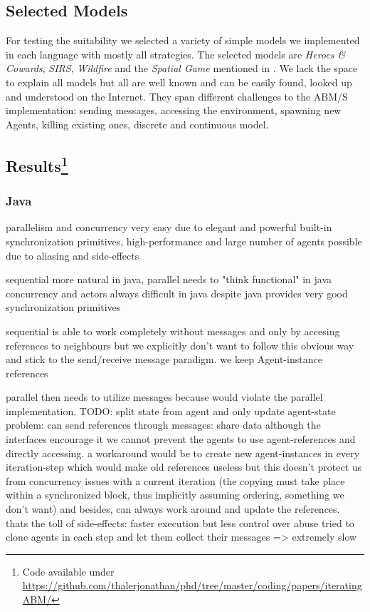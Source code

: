 \subsection{Selected Models}
For testing the suitability we selected a variety of simple models we implemented in each language with mostly all strategies. The selected models are \textit{Heroes \& Cowards}, \textit{SIRS}, \textit{Wildfire} and the \textit{Spatial Game} mentioned in \cite{huberman_evolutionary_1993}. We lack the space to explain all models but all are well known and can be easily found, looked up and understood on the Internet. They span different challenges to the ABM/S implementation: sending messages, accessing the environment, spawning new Agents, killing existing ones, discrete and continuous model.

\subsection[Results]{Results\footnote{Code available under\\ \url{https://github.com/thalerjonathan/phd/tree/master/coding/papers/iteratingABM/}}}

\subsubsection{Java}
parallelism and concurrency very easy due to elegant and powerful built-in synchronization primitives, high-performance and large number of agents possible due to aliasing and side-effects

sequential more natural in java,
parallel needs to "think functional" in java
concurrency and actors always difficult in java despite java provides very good synchronization primitives

sequential is able to work completely without messages and only by accesing references to neighbours but we explicitly don't want to follow this obvious way and stick to the send/receive message paradigm. we keep Agent-instance references

parallel then needs to utilize messages because would violate the parallel implementation. TODO: split state from agent and only update agent-state
problem: can send references through messages: share data
although the interfaces encourage it we cannot prevent the agents to use agent-references and directly accessing. a workaround would be to create new agent-instances in every iteration-step which would make old references useless but this doesn't protect us from concurrency issues with a current iteration (the copying must take place within a synchronized block, thus implicitly assuming ordering, something we don't want) and besides, can always work around and update the references.
thats the toll of side-effects: faster execution but less control over abuse
tried to clone agents in each step and let them collect their messages => extremely slow


